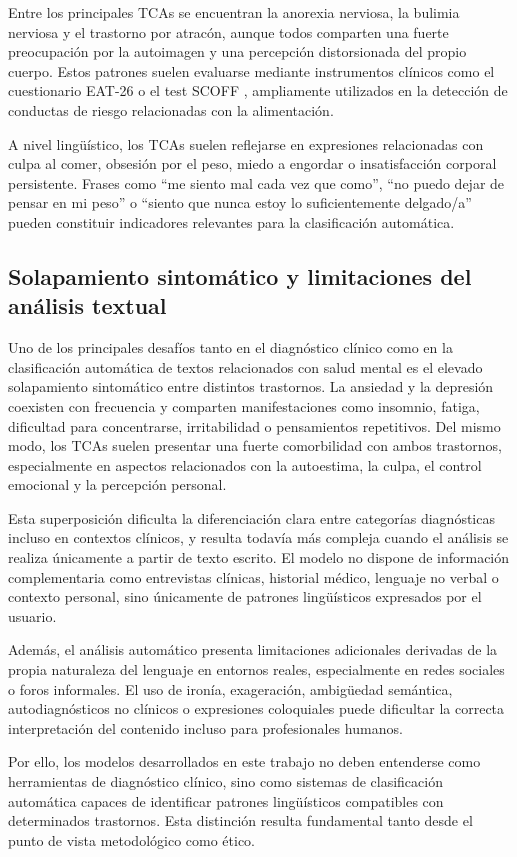 Entre los principales \acp{TCA} se encuentran la anorexia nerviosa, la bulimia nerviosa y el trastorno por atracón, aunque todos comparten una fuerte preocupación por la autoimagen y una percepción distorsionada del propio cuerpo. Estos patrones suelen evaluarse mediante instrumentos clínicos como el cuestionario \ac{EAT-26} \cite{garner_eating_1982} o el test SCOFF \cite{morgan_scoff_1999}, ampliamente utilizados en la detección de conductas de riesgo relacionadas con la alimentación.

A nivel lingüístico, los \acp{TCA} suelen reflejarse en expresiones relacionadas con culpa al comer, obsesión por el peso, miedo a engordar o insatisfacción corporal persistente. Frases como “me siento mal cada vez que como”, “no puedo dejar de pensar en mi peso” o “siento que nunca estoy lo suficientemente delgado/a” pueden constituir indicadores relevantes para la clasificación automática.

\subsection{Solapamiento sintomático y limitaciones del análisis textual}

Uno de los principales desafíos tanto en el diagnóstico clínico como en la clasificación automática de textos relacionados con salud mental es el elevado solapamiento sintomático entre distintos trastornos. La ansiedad y la depresión coexisten con frecuencia y comparten manifestaciones como insomnio, fatiga, dificultad para concentrarse, irritabilidad o pensamientos repetitivos. Del mismo modo, los \acp{TCA} suelen presentar una fuerte comorbilidad con ambos trastornos, especialmente en aspectos relacionados con la autoestima, la culpa, el control emocional y la percepción personal.

Esta superposición dificulta la diferenciación clara entre categorías diagnósticas incluso en contextos clínicos, y resulta todavía más compleja cuando el análisis se realiza únicamente a partir de texto escrito. El modelo no dispone de información complementaria como entrevistas clínicas, historial médico, lenguaje no verbal o contexto personal, sino únicamente de patrones lingüísticos expresados por el usuario.

Además, el análisis automático presenta limitaciones adicionales derivadas de la propia naturaleza del lenguaje en entornos reales, especialmente en redes sociales o foros informales. El uso de ironía, exageración, ambigüedad semántica, autodiagnósticos no clínicos o expresiones coloquiales puede dificultar la correcta interpretación del contenido incluso para profesionales humanos.

Por ello, los modelos desarrollados en este trabajo no deben entenderse como herramientas de diagnóstico clínico, sino como sistemas de clasificación automática capaces de identificar patrones lingüísticos compatibles con determinados trastornos. Esta distinción resulta fundamental tanto desde el punto de vista metodológico como ético.


